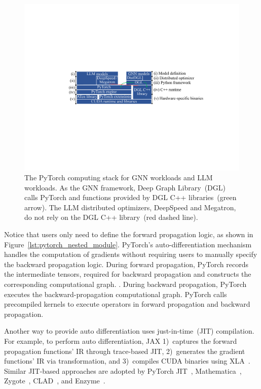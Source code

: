 \begin{figure}[!t]
    \centering
    \includegraphics[width=0.85\linewidth]{figures/Intro/pytorch_stack.pdf}
    \caption{The PyTorch computing stack for GNN workloads and LLM workloads. As the GNN framework, Deep Graph Library~(DGL) calls PyTorch  and functions provided by DGL C++ libraries~(green arrow). The LLM distributed optimizers, DeepSpeed and Megatron, do not rely on the DGL C++ library~(red dashed line). }
    \label{fig:pytorch_stack}
\end{figure}


Notice that users only need to define the forward propagation logic, as shown in Figure~\ref{lst:pytorch_nested_module}. PyTorch's auto-differentiation mechanism handles the computation of gradients without requiring users to manually specify the backward propagation logic. During forward propagation, PyTorch records  the intermediate tensors,  required for backward propagation and constructs the corresponding computational graph. . During backward propagation, PyTorch executes the backward-propagation computational graph. PyTorch calls precompiled kernels to execute operators in forward propagation and backward propagation.


Another way to provide auto differentiation uses just-in-time~(JIT) compilation. For example, to perform auto differentiation, JAX 1)~captures the forward propagation functions' IR through trace-based JIT, 2)~generates the gradient functions' IR via transformation, and 3)~compiles CUDA binaries using XLA~\cite{joergAutomatedGPUKernel2019}. Similar JIT-based approaches are adopted by PyTorch JIT~\cite{pengwuWorkshopsASPLOS_2024README}, Mathematica~\cite{dakkakCompilingHighlevelScripting2020}, Zygote~\cite{zygoteFluxMLZygoteJl2019}, CLAD~\cite{ioanaifrimGPUAccelerationAutomatic2021}, and Enzyme~\cite{mosesReversemodeAutomaticDifferentiation2021}.

